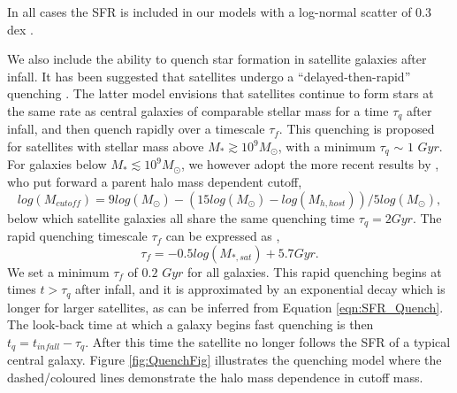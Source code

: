 In all cases the SFR is included in our models with a log-normal scatter of 0.3 dex \citep{Leja2015ReconcilingFunction}.


We also include the ability to quench star formation in satellite galaxies after infall. It has been suggested that satellites undergo a ``delayed-then-rapid'' quenching \citep{Wetzel2013GalaxyUniverse}. The latter model envisions that satellites continue to form stars at the same rate as central galaxies of comparable stellar mass for a time $\tau_q$ after infall, and then quench rapidly over a timescale $\tau_{f}$. This quenching is proposed for satellites with stellar mass above $M_*\gtrsim 10^9 M_{\odot}$, with a minimum $\tau_q$ $\sim$ $1$ $Gyr$. For galaxies below $M_* \lesssim 10^{9} M_{\odot}$, we however adopt the more recent results by \citet{Fillingham2016UnderStripping}, who put forward a parent halo mass dependent cutoff,
\begin{equation}
\label{eqn:Cutoff}
log(M_{cutoff}) = 9 log(M_{\odot}) - (15 log(M_{\odot}) - log(M_{h,host}))/5log(M_{\odot}) ,
\end{equation}
below which satellite galaxies all share the same quenching time $\tau_q=2 Gyr$.
The rapid quenching timescale $\tau_{f}$ can be expressed as \citep{Wetzel2013GalaxyUniverse},
\begin{equation}
\label{eqn:tauf}
\tau_f = -0.5 log(M_{*,sat}) + 5.7Gyr .
\end{equation}
We set a minimum $\tau_{f}$ of $0.2$ $Gyr$ for all galaxies. This rapid quenching begins at times $t > \tau_q$ after infall, and it is approximated by an exponential decay which is longer for larger satellites, as can be inferred from Equation \ref{eqn:SFR_Quench}. The look-back time at which a galaxy begins fast quenching is then $t_q = t_{infall} - \tau_q$. After this time the satellite no longer follows the SFR of a typical central galaxy. Figure \ref{fig:QuenchFig} illustrates the quenching model where the dashed/coloured lines demonstrate the halo mass dependence in cutoff mass.

